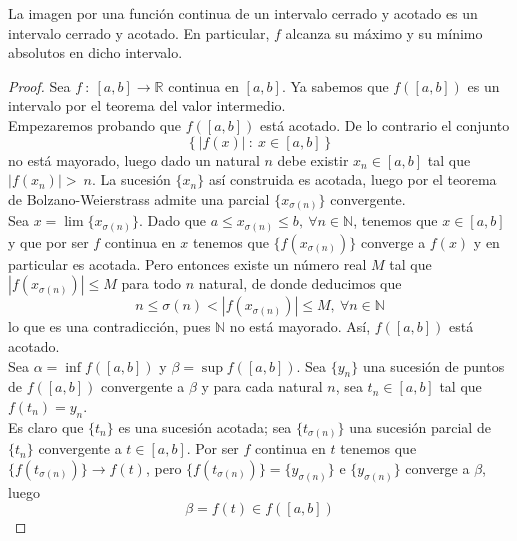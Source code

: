 \begin{teo}
    La imagen por una función continua de un intervalo cerrado y acotado es un intervalo cerrado y acotado. En particular, $f$ alcanza su máximo y su mínimo absolutos en dicho intervalo.
\end{teo}
\begin{proof}
    Sea $f ~:~ [a,b] \longrightarrow \mathbb{R}$ continua en $[a,b]$. Ya sabemos que $f([a,b])$ es un intervalo por el teorema del valor intermedio.\\
    
    Empezaremos probando que $f([a,b])$ está acotado. De lo contrario el conjunto
    \begin{equation*}
        \left\{ \left| f(x) \right| ~:~ x \in [a,b] \right\}
    \end{equation*}
    no está mayorado, luego dado un natural $n$ debe existir $x_n \in [a,b]$ tal que $|f(x_n)| >~n$.
    La sucesión $\{x_n\}$ así construida es acotada, luego por el teorema de Bolzano-Weierstrass admite una parcial $\{x_{\sigma(n)}\}$ convergente.\\
    
    Sea $x = \lim \{x_{\sigma(n)}\}$. Dado que $a \leq x_{\sigma(n)} \leq b, ~ \forall n \in \mathbb{N}$, tenemos que $x \in [a,b]$ y que por ser $f$ continua en $x$ tenemos que $\{f(x_{\sigma(n)})\}$ converge a $f(x)$ y 
    en particular es acotada. Pero entonces existe un número real $M$ tal que $|f(x_{\sigma(n)})| \leq M$ para todo $n$ natural, de donde deducimos que
    \begin{equation*}
        n \leq \sigma(n) < |f(x_{\sigma(n)})| \leq M, ~ \forall n \in \mathbb{N}
    \end{equation*}
    lo que es una contradicción, pues $\mathbb{N}$ no está mayorado. Así,  $f([a,b])$ está acotado.\\
    
    Sea $\alpha = \inf f([a,b])$ y $\beta = \sup f([a,b])$. Sea $\{y_n\}$ una sucesión de puntos de $f([a,b])$
    convergente a $\beta$ y para cada natural $n$, sea $t_n \in [a,b]$ tal que $f(t_n) = y_n$.\\
    
    Es claro que $\{t_n\}$ es una sucesión acotada; sea $\{t_{\sigma(n)}\}$ una sucesión parcial de $\{t_n\}$
    convergente a $t \in [a,b]$. Por ser $f$ continua en $t$ tenemos que $\{f(t_{\sigma(n)})\} \longrightarrow f(t)$, pero
    $\{f(t_{\sigma(n)})\} = \{y_{\sigma(n)}\}$ e $\{y_{\sigma(n)}\}$ converge a $\beta$, luego
    \begin{equation*}
        \beta = f(t) \in f([a,b])
    \end{equation*}
    

\end{proof}
